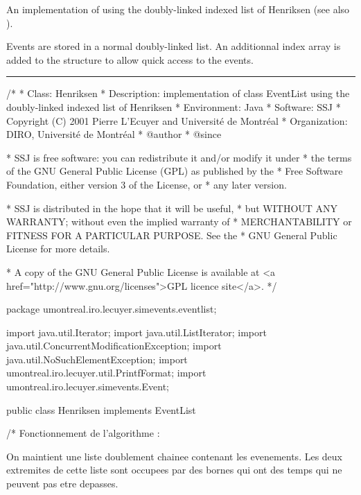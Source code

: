 
An implementation of  using the doubly-linked
indexed list of Henriksen \cite{sKIN86a} (see also \cite[p. 207]{sFIS01a}).

Events are stored in a normal doubly-linked list. An additionnal
index array is added to the structure to allow quick access to the
events.

\bigskip\hrule

\begin{code}
\begin{hide}
/*
 * Class:        Henriksen
 * Description:  implementation of class EventList using the doubly-linked
                 indexed list of Henriksen
 * Environment:  Java
 * Software:     SSJ 
 * Copyright (C) 2001  Pierre L'Ecuyer and Université de Montréal
 * Organization: DIRO, Université de Montréal
 * @author       
 * @since

 * SSJ is free software: you can redistribute it and/or modify it under
 * the terms of the GNU General Public License (GPL) as published by the
 * Free Software Foundation, either version 3 of the License, or
 * any later version.

 * SSJ is distributed in the hope that it will be useful,
 * but WITHOUT ANY WARRANTY; without even the implied warranty of
 * MERCHANTABILITY or FITNESS FOR A PARTICULAR PURPOSE.  See the
 * GNU General Public License for more details.

 * A copy of the GNU General Public License is available at
   <a href="http://www.gnu.org/licenses">GPL licence site</a>.
 */
\end{hide}
package umontreal.iro.lecuyer.simevents.eventlist;\begin{hide}

import java.util.Iterator;
import java.util.ListIterator;
import java.util.ConcurrentModificationException;
import java.util.NoSuchElementException;
import umontreal.iro.lecuyer.util.PrintfFormat;
import umontreal.iro.lecuyer.simevents.Event;
\end{hide}

public class Henriksen implements EventList \begin{hide} {
   /*
     Fonctionnement de l'algorithme :

     On maintient une liste doublement chainee contenant les evenements.
     Les deux extremites de cette liste sont occupees par des bornes qui
     ont des temps qui ne peuvent pas etre depasses.

}
\end{hide}
\end{code}
